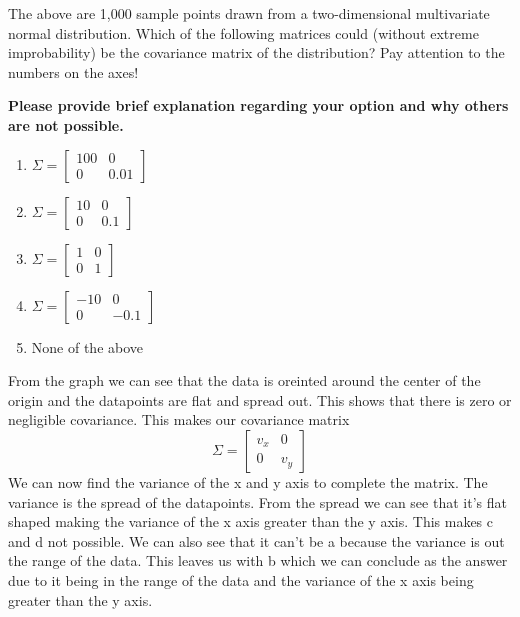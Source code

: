 \documentclass{article}
\begin{document}
The above are 1,000 sample points drawn from a two-dimensional multivariate normal distribution.
Which of the following matrices could (without extreme improbability) be the covariance matrix of the distribution? Pay attention to the numbers on the axes!

\textbf{Please provide brief explanation regarding your option and why others are not possible.}

\begin{enumerate}[label=(\alph*)]
    \item $ \Sigma =
    \begin{bmatrix}
        100 & 0 \\
        0 & 0.01    
    \end{bmatrix}$
    \item $ \Sigma =
    \begin{bmatrix}
        10 & 0 \\
        0 & 0.1
    \end{bmatrix}$
    \item $ \Sigma =
    \begin{bmatrix}
        1 & 0 \\
        0 & 1
    \end{bmatrix}$
    \item $ \Sigma =
    \begin{bmatrix}
        -10 & 0 \\
        0 & -0.1
    \end{bmatrix}$
    \item None of the above
\end{enumerate}

From the graph we can see that the data is oreinted around the center of the origin and the datapoints are flat and spread out. This shows that there is zero or negligible covariance. This makes our covariance matrix 
\begin{equation}
    \Sigma =
    \begin{bmatrix}
        v_x & 0 \\
        0 & v_y
    \end{bmatrix}
\end{equation}
We can now find the variance of the x and y axis to complete the matrix. The variance is the spread of the datapoints. From the spread we can see that it's flat shaped making the variance of the x axis greater than the y axis. This makes c and d not possible. We can also see that it can't be a because the variance is out the range of the data. This leaves us with b which we can conclude as the answer due to it being in the range of the data and the variance of the x axis being greater than the y axis.
\end{document}

